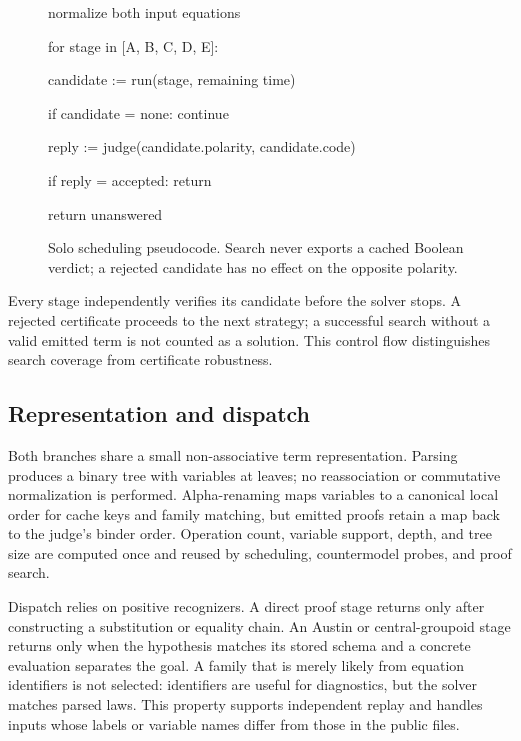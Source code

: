 \documentclass[10pt,twocolumn]{article}
\providecommand{\Description}[1]{}
\begin{document}
\begin{figure}[t]
\footnotesize\ttfamily
normalize both input equations\par
for stage in [A, B, C, D, E]:\par
\hspace*{1em}candidate := run(stage, remaining time)\par
\hspace*{1em}if candidate = none: continue\par
\hspace*{1em}reply := judge(candidate.polarity, candidate.code)\par
\hspace*{1em}if reply = accepted: return\par
return unanswered
\caption{Solo scheduling pseudocode.  Search never exports a cached Boolean
verdict; a rejected candidate has no effect on the opposite polarity.}
\Description{Pseudocode normalizes the equations, executes five stages in
order, submits each complete candidate to the judge, and stops only on
acceptance.}
\label{fig:scheduler}
\end{figure}

Every stage independently verifies its candidate before the solver stops.  A
rejected certificate proceeds to the next strategy; a successful search
without a valid emitted term is not counted as a solution.  This control flow
distinguishes search coverage from certificate robustness.

\subsection{Representation and dispatch}

Both branches share a small non-associative term representation.  Parsing
produces a binary tree with variables at leaves; no reassociation or
commutative normalization is performed.  Alpha-renaming maps variables to a
canonical local order for cache keys and family matching, but emitted proofs
retain a map back to the judge's binder order.  Operation count, variable
support, depth, and tree size are computed once and reused by scheduling,
countermodel probes, and proof search.

Dispatch relies on positive recognizers.  A direct proof stage
returns only after constructing a substitution or equality chain.  An Austin
or central-groupoid stage returns only when the hypothesis matches its stored
schema and a concrete evaluation separates the goal.  A family that is merely
likely from equation identifiers is not selected: identifiers are useful for
diagnostics, but the solver matches parsed laws.  This property supports
independent replay and handles inputs whose labels or variable names differ
from those in the public files.
\end{document}
